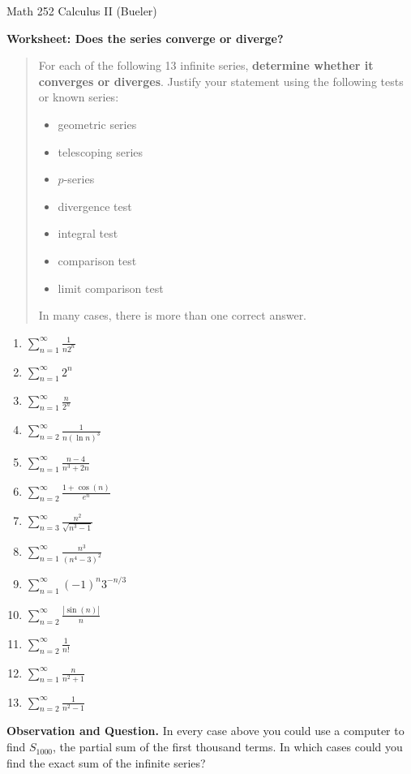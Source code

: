 \documentclass[11pt]{amsart}
\begin{document}
\scriptsize \noindent Math 252 Calculus II (Bueler) \hfill {}
\normalsize\medskip

\Large\centerline{\textbf{Worksheet: Does the series converge or diverge?}}
\normalsize
\medskip

\thispagestyle{empty}
\begin{quote}
For each of the following 13 infinite series, \textbf{determine whether it converges or diverges}.  Justify your statement using the following tests or known series:
    \begin{itemize}
    \item geometric series
    \item telescoping series
    \item $p$-series
    \item divergence test
    \item integral test
    \item comparison test
    \item limit comparison test
    \end{itemize}
In many cases, there is more than one correct answer.
\end{quote}

\medskip
\renewcommand{\labelenumi}{\textbf{\Alph{enumi}.}}
\begin{enumerate}
\setlength\itemsep{19mm}
\item   \qquad $\displaystyle \sum_{n=1}^\infty \frac{1}{n2^n}$
\item   \qquad $\displaystyle \sum_{n=1}^\infty 2^{n}$
\item   \qquad $\displaystyle \sum_{n=1}^\infty \frac{n}{2^n}$
\item   \qquad $\displaystyle \sum_{n=2}^\infty \frac{1}{n (\ln n)^3}$
\item   \qquad $\displaystyle \sum_{n=1}^\infty \frac{n-4}{n^3+2n}$
\item   \qquad $\displaystyle \sum_{n=2}^\infty \frac{1+\cos(n)}{e^n}$
\item   \qquad $\displaystyle \sum_{n=3}^\infty \frac{n^2}{\sqrt{n^3-1}}$
\item   \qquad $\displaystyle \sum_{n=1}^\infty \frac{n^3}{(n^4-3)^2}$
\item   \qquad $\displaystyle \sum_{n=1}^\infty (-1)^n 3^{-n/3}$
\item   \qquad $\displaystyle \sum_{n=2}^\infty \frac{|\sin(n)|}{n}$
\item   \qquad $\displaystyle \sum_{n=2}^\infty \frac{1}{n!}$
\item   \qquad $\displaystyle \sum_{n=1}^\infty \frac{n}{n^2+1}$
\item   \qquad $\displaystyle \sum_{n=2}^\infty \frac{1}{n^2-1}$
\end{enumerate}

\vfill
\noindent \textbf{Observation and Question.}  In every case above you could use a computer to find $S_{1000}$, the partial sum of the first thousand terms.  In which cases could you find the exact sum of the infinite series?
\vspace{0.5in}
\end{document}
